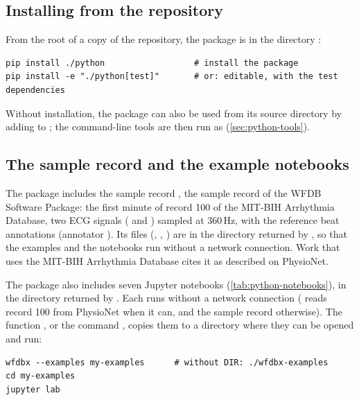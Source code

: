 \subsection{Installing from the repository}

From the root of a copy of the repository, the package is in the directory
:

\begin{lstlisting}[style=shell]
pip install ./python                  # install the package
pip install -e "./python[test]"       # or: editable, with the test dependencies
\end{lstlisting}

Without installation, the package can also be used from its source directory by adding
 to ; the command-line tools are then run as
 (\cref{sec:python-tools}).

\subsection{The sample record and the example notebooks}
\label{sec:python-resources}

The package includes the sample record , the sample record of the WFDB
Software Package: the first minute of record 100 of the MIT-BIH Arrhythmia Database, two
ECG signals ( and ) sampled at 360\,Hz, with the reference beat
annotations (annotator ). Its files (, ,
) are in the directory returned by , so
that the examples and the notebooks run without a network connection. Work that uses the
MIT-BIH Arrhythmia Database cites it as described on PhysioNet.

The package also includes seven Jupyter notebooks (\cref{tab:python-notebooks}), in the
directory returned by . Each runs without a network
connection ( reads record 100 from PhysioNet when it can,
and the sample record otherwise). The function , or the command
, copies them to a directory where they can be opened and run:

\begin{lstlisting}[style=shell]
wfdbx --examples my-examples      # without DIR: ./wfdbx-examples
cd my-examples
jupyter lab
\end{lstlisting}

